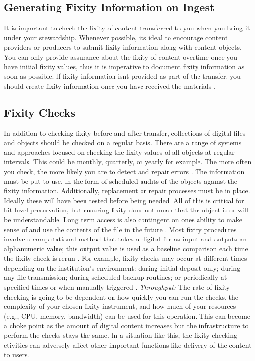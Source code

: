 \subsection{Generating Fixity Information on Ingest}
 It is important to check the fixity
of content transferred to you when you bring it under your stewardship. Whenever possible, its ideal to encourage content providers or producers to submit fixity information along with content objects. You can only provide assurance about the fixity of content overtime once you have initial fixity values, thus it is imperative to document fixity information as soon as possible. If fixity information isnt provided as part of the transfer, you should create fixity information once you have received the materials \cite[4]{ndsa2014fixity}.
\subsection{Fixity Checks}
In addition to checking fixity before and after transfer, collections of digital files and objects should be checked on a regular basis. There are a range of systems and approaches focused on checking the fixity values of all objects at regular intervals. This could be monthly, quarterly, or yearly for example. The more often you check, the more likely you are to detect and repair errors \cite[4]{ndsa2014fixity}.
The information must be put to use, in the form of scheduled audits of the objects against the fixity information. Additionally, replacement or repair processes must be in place. Ideally these will have been tested before being needed. All of this is critical for bit-level preservation, but ensuring fixity does not mean that the object is or will be understandable. Long term access is also contingent on ones ability to make sense of and use the contents of the file in the future \cite[2]{ndsa2014fixity}.
Most fixity procedures involve a computational method that takes a digital file as input and outputs an alphanumeric value; this output value is used as a baseline comparison each time the fixity check is rerun \cite[5]{ndsa2017fixity}. 
For example, fixity checks may occur at different times depending on the institution's environment: during initial deposit only; during any file transmission; during scheduled backup routines; or periodically at specified times or when manually triggered \cite[7]{ndsa2017fixity}.
\textit{Throughput:} The rate of fixity checking is going to be dependent on how quickly you can run the checks, the complexity of your chosen fixity instrument, and how much of your resources (e.g., CPU, memory, bandwidth) can be used for this operation. This can become a choke point as the amount of digital content increases but the infrastructure to perform the checks stays the same. In a situation like this, the fixity checking  ctivities can adversely affect other important functions like delivery of the content to users.
